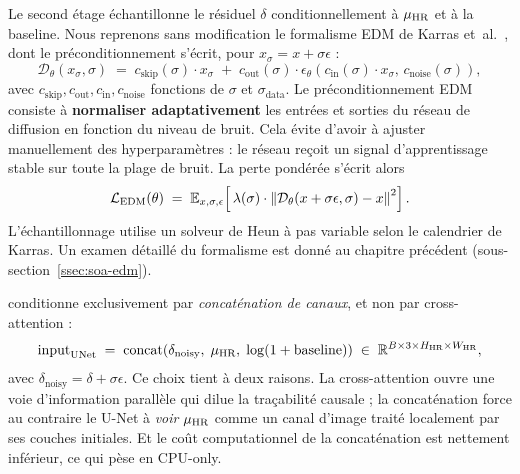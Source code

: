 Le second étage échantillonne le résiduel $\delta$ conditionnellement à $\mu_{\text{HR}}$ et à la baseline. Nous reprenons sans modification le formalisme EDM de Karras et~al.~\cite{karras_edm_2022}, dont le préconditionnement s'écrit, pour $x_\sigma = x + \sigma \epsilon$ :
\begin{equation}
  \mathcal{D}_\theta(x_\sigma, \sigma) \;=\; c_{\mathrm{skip}}(\sigma) \cdot x_\sigma \;+\; c_{\mathrm{out}}(\sigma) \cdot \epsilon_\theta\!\left( c_{\mathrm{in}}(\sigma) \cdot x_\sigma,\, c_{\mathrm{noise}}(\sigma) \right),
  \label{eq:edm-precond}
\end{equation}
avec $c_{\mathrm{skip}}, c_{\mathrm{out}}, c_{\mathrm{in}}, c_{\mathrm{noise}}$ fonctions de $\sigma$ et $\sigma_{\mathrm{data}}$. Le préconditionnement EDM consiste à \textbf{normaliser adaptativement} les entrées et sorties du réseau de diffusion en fonction du niveau de bruit. Cela évite d'avoir à ajuster manuellement des hyperparamètres : le réseau reçoit un signal d'apprentissage stable sur toute la plage de bruit. La perte pondérée s'écrit alors
\begin{equation}
  \mathcal{L}_{\mathrm{EDM}}(\theta) \;=\; \mathbb{E}_{x, \sigma, \epsilon}\!\left[\, \lambda(\sigma) \cdot \left\| \mathcal{D}_\theta\!\left( x + \sigma \epsilon, \sigma \right) - x \right\|^2 \right].
  \label{eq:edm-loss}
\end{equation}
L'échantillonnage utilise un solveur de Heun à pas variable selon le calendrier de Karras. Un examen détaillé du formalisme est donné au chapitre précédent (sous-section~\ref{ssec:soa-edm}).

\Oracle{} conditionne exclusivement par \emph{concaténation de canaux}, et non par cross-attention :
\begin{equation}
  \mathrm{input}_{\mathrm{UNet}} \;=\; \mathrm{concat}\!\left( \delta_{\mathrm{noisy}},\; \mu_{\text{HR}},\; \log(1 + \mathrm{baseline}) \right) \;\in\; \mathbb{R}^{B \times 3 \times H_{\text{HR}} \times W_{\text{HR}}},
  \label{eq:causal-concat}
\end{equation}
avec $\delta_{\mathrm{noisy}} = \delta + \sigma \epsilon$. Ce choix tient à deux raisons. La cross-attention ouvre une voie d'information parallèle qui dilue la traçabilité causale ; la concaténation force au contraire le U-Net à \emph{voir} $\mu_{\text{HR}}$ comme un canal d'image traité localement par ses couches initiales. Et le coût computationnel de la concaténation est nettement inférieur, ce qui pèse en CPU-only.

